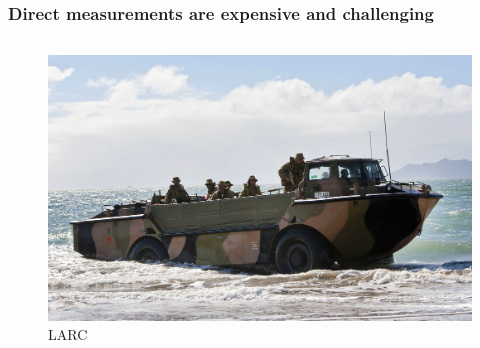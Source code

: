 \documentclass[7pt]{beamer}
\begin{document}
\begin{frame}
    \frametitle{Direct measurements are expensive and challenging}

    \begin{columns}
    
            \centering
            \begin{figure}[h!]
                \includegraphics[width=1\linewidth]{img/LARC2.jpg}\hfill
                \centering
                \captionsetup{labelformat=empty}
                \caption{LARC}
            \end{figure}
        

\end{columns}
\end{frame}
\end{document}
